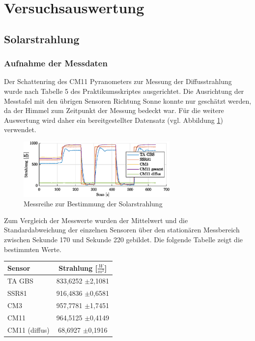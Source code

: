 \section{Versuchsauswertung}

\subsection{Solarstrahlung} 

\subsubsection{Aufnahme der Messdaten}

Der Schattenring des CM11 Pyranometers zur Messung der Diffusstrahlung wurde nach Tabelle 5 des Praktikumsskriptes ausgerichtet. Die Ausrichtung der Messtafel mit den übrigen Sensoren Richtung Sonne konnte nur geschätzt werden, da der Himmel zum Zeitpunkt der Messung bedeckt war. Für die weitere Auswertung wird daher ein bereitgestellter Datensatz (vgl. Abbildung \ref{fig:radiation}) verwendet.

\begin{figure}[H]
	\centering
	\includegraphics[width=0.7\textwidth]{../DATA/Messreihe_Strahlung.eps}
	\caption[Messreihe zur Bestimmung der Solarstrahlung]{Messreihe zur Bestimmung der Solarstrahlung}
	\label{fig:radiation}
\end{figure}
Zum Vergleich der Messwerte wurden der Mittelwert und die Standardabweichung der einzelnen Sensoren über den stationären Messbereich zwischen Sekunde 170 und Sekunde 220 gebildet. Die folgende Tabelle zeigt die bestimmten Werte.

\begin{center}
\begin{tabular}{l|c}
	\label{tab:radiation}
	
	\textbf{Sensor} & \textbf{Strahlung [$\frac{W}{m^2}$]}\\
	\hline
	TA GBS & 833,6252 $\pm$2,1081\\
	SSR81 & 916,4836 $\pm$0,6581\\
	CM3 & 957,7781 $\pm$1,7451\\
	CM11 & 964,5125 $\pm$0,4149\\
	CM11 (diffus) & 68,6927 $\pm$0,1916
\end{tabular} 
\end{center}

